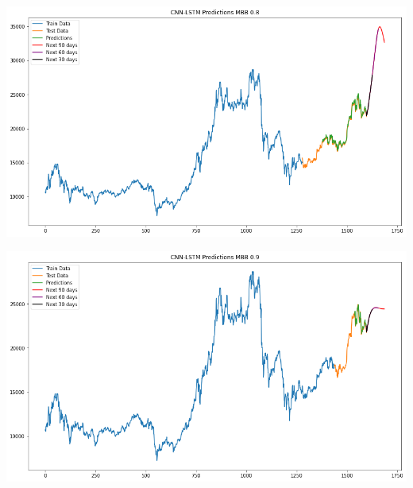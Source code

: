 \documentclass[conference]{IEEEtran}
\begin{document}
\begin{minipage}{0.23\textwidth}
    \centering
    \includegraphics[width=\linewidth]{images/CNN-LSTM/CNNLSTM_MBB_82.png}
    \label{fig:image1}
\end{minipage}
\hfill
\begin{minipage}{0.23\textwidth}
    \centering
    \includegraphics[width=\linewidth]{images/CNN-LSTM/CNNLSTM_MBB_91.png}
    \label{fig:image2}
\end{minipage}
\end{document}
